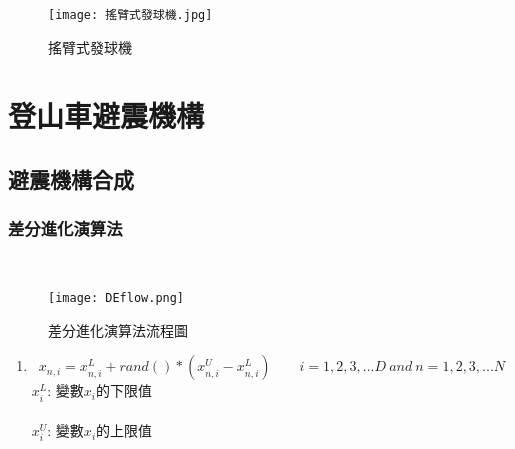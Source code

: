 \documentclass[14pt,a4paper]{report}  %
\newcommand{\fourteen}{\fontsize{14pt}{\baselineskip}\selectfont}%
\begin{document}
{    \begin{figure}[H]
        \centering
        \texttt{[image: 搖臂式發球機.jpg]} 
        \caption{搖臂式發球機} %
        \label{fig_Double Ball Lifter1:scale} %
    \end{figure}
    
    
        \chapter{登山車避震機構}
      \section{避震機構合成}
      \subsection{差分進化演算法}
 
      \fourteen {}\\
	        
      \begin{figure}[hbt!]
        \centering
        \texttt{[image: DEflow.png]}
        \caption{差分進化演算法流程圖}
        \label{fig_DEflow:scale}
    	\end{figure}
      
      \newpage
      \begin{enumerate}
      \item{\fourteen {初始化(Initialization):設定初始參數值及隨機產生介於上下限值以內的變數。}
      \begin{equation*}
      x_{n,i} = x_{n,i}^{L}+rand()*(x_{n,i}^{U}- x_{n,i}^{L})
	\qquad
i = 1,2,3,...D \ and \ n = 1,2,3,...N
	  \end{equation*}
	  $x_{i}^{L}$: 變數$x_{i}$的下限值
	  \hspace*{\fill} \\
	  \hspace*{\fill} \\
	  $x_{i}^{U}$: 變數$x_{i}$的上限值
	  }
	      

\end{enumerate}}
\end{document}
